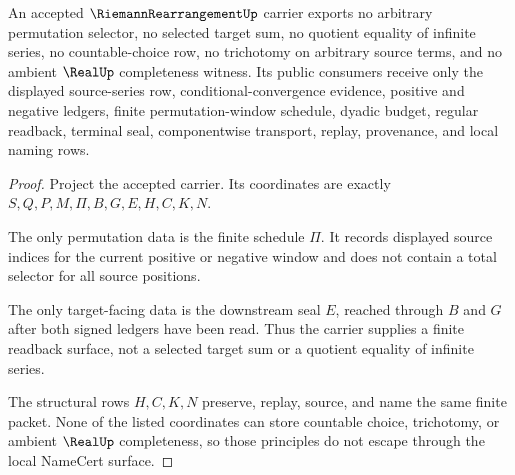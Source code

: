\begin{theorem}
\label{thm:riemann-rearrangement-selector-nonescape}
An accepted $\RiemannRearrangementUp$ carrier exports no arbitrary permutation selector, no selected target sum, no quotient equality of infinite series, no countable-choice row, no trichotomy on arbitrary source terms, and no ambient $\RealUp$ completeness witness. Its public consumers receive only the displayed source-series row, conditional-convergence evidence, positive and negative ledgers, finite permutation-window schedule, dyadic budget, regular readback, terminal seal, componentwise transport, replay, provenance, and local naming rows.
\end{theorem}
\begin{proof}
Project the accepted carrier. Its coordinates are exactly $S,Q,P,M,\Pi,B,G,E,H,C,K,N$.

The only permutation data is the finite schedule $\Pi$. It records displayed source indices for the current positive or negative window and does not contain a total selector for all source positions.

The only target-facing data is the downstream seal $E$, reached through $B$ and $G$ after both signed ledgers have been read. Thus the carrier supplies a finite readback surface, not a selected target sum or a quotient equality of infinite series.

The structural rows $H,C,K,N$ preserve, replay, source, and name the same finite packet. None of the listed coordinates can store countable choice, trichotomy, or ambient $\RealUp$ completeness, so those principles do not escape through the local NameCert surface.
\end{proof}



